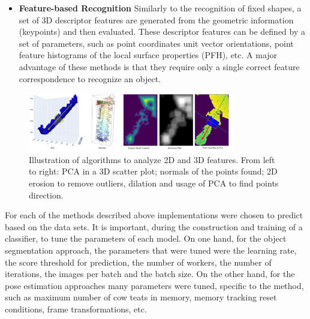 \begin{itemize}
    \item \textbf{Feature-based Recognition} Similarly to the recognition of fixed shapes, a set of 3D descriptor features are generated from the geometric information (keypoints) and then evaluated. These descriptor features can be defined by a set of  parameters, such as point coordinates unit vector orientations, point feature histograms of the local surface properties (PFH), etc. A major advantage of these methods is that they require only a single correct feature correspondence to recognize an object.
    
\end{itemize}
\begin{figure}[!ht]
        \centering
        \includegraphics[width=0.8\textwidth]{images/cow_pose_methods.png}
        \caption{Illustration of algorithms to analyze 2D and 3D features. From left to right: PCA in a 3D scatter plot; normals of the points found; 2D erosion to remove outliers, dilation and usage of PCA to find points direction.}
        \label{fig:cow_fmc}
    \end{figure}
For each of the methods described above implementations were chosen to predict based on the data sets.  It is important, during the construction and training of a classifier, to tune the parameters of each model. On one hand, for the object segmentation approach, the parameters that were tuned were the learning rate, the score threshold for prediction, the number of workers, the number of iterations, the images per batch and the batch size. On the other hand, for the pose estimation approaches many parameters were tuned, specific to the method, such as maximum number of cow teats in memory, memory tracking reset conditions, frame transformations, etc.

